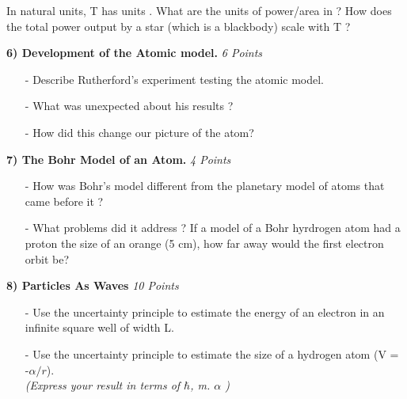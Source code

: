 {In natural units, T has units \GeV.  What are the units of power/area in \GeV ? How does the total power output by a star (which is a blackbody) scale with T ?

\vfill

\clearpage

\begin{minipage}{\textwidth}
\textbf{6) Development of the Atomic model. }\hfill \textit{6 Points}
\begin{itemize}
\item[-]Describe Rutherford's experiment testing the atomic model.
\vspace*{1.in}
\item[-]What was unexpected about his results ?
\vspace*{1.in}
\item[-]How did this change our picture of the atom?
\end{itemize}
\end{minipage}

\begin{minipage}{\textwidth}
\textbf{7) The Bohr Model of an Atom. }\hfill \textit{4 Points}
\begin{itemize}
\item[-] How was Bohr's model different from the planetary model of atoms that came before it ?
\vspace*{1in}
\item[-] What problems did it address ?
\vspace*{1in}
If a model of a Bohr hyrdrogen atom had a proton the size of an orange (5 cm), how far away would the first electron orbit be?
\end{itemize}
\end{minipage}

\vspace{0.25in}

\begin{minipage}{\textwidth}
\textbf{8) Particles As Waves } \hfill \textit{10 Points}
\begin{itemize}
\item[-] Use the uncertainty principle to estimate the energy of an electron in an infinite square well of width L.
\vspace*{2in}
\item[-] Use the uncertainty principle to estimate the size of a hydrogen atom (V = -$\alpha/r$). \\ \textit{(Express your result in terms of $\hbar$, m. $\alpha$ )}
\vspace*{1in}
\end{itemize}
\end{minipage}
\vspace{0.25in}


}

